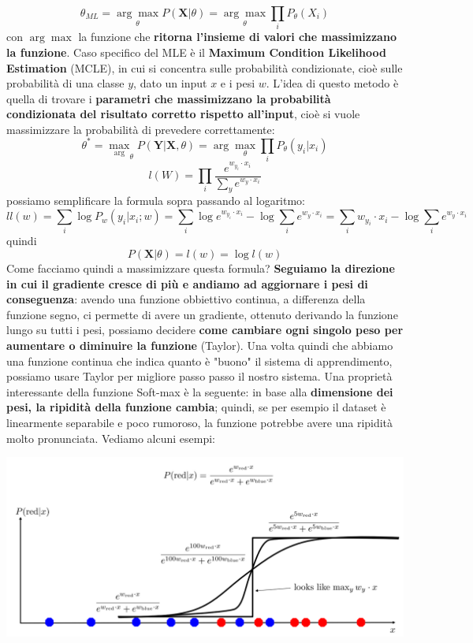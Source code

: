 \documentclass[12pt]{article}
\begin{document}
$$\theta_{ML} = \underset{\theta}{\arg \max} P(\boldsymbol{X}|\theta) = \underset{\theta}{\arg \max} \prod_i P_{\theta}(X_i)$$
con $\arg \max$ la funzione che \textbf{ritorna l'insieme di valori che massimizzano la funzione}. Caso specifico del MLE è il \textbf{Maximum Condition Likelihood Estimation} (MCLE), in cui si concentra sulle probabilità condizionate, cioè sulle probabilità di una classe $y$, dato un input $x$ e i pesi $w$.
L'idea di questo metodo è quella di trovare i \textbf{parametri che massimizzano la probabilità condizionata del risultato corretto rispetto all'input}, cioè si vuole massimizzare la probabilità di prevedere correttamente:
$$\theta^* = \underset \arg \max_{\theta} P(\boldsymbol{Y}| \boldsymbol{X}, \theta) = \arg \max_{\theta} \prod_i P_{\theta}(y_i|x_i)$$
$$l(W) = \prod_i \frac{e^{w_{y_i} \cdot x_i}}{\sum_y e^{w_y \cdot x_i}}$$
possiamo semplificare la formula sopra passando al logaritmo:
$$ll(w) = \sum_i \log P_w(y_i|x_i; w) = \sum_i \log e^{w_{y_i} \cdot  x_i} - \log \sum_i e^{w_y \cdot x_i} = \sum_i w_{y_i} \cdot x_i - \log \sum_i e^{w_y \cdot x_i}$$
quindi
$$P(\boldsymbol{X}|\theta) = l(w) = \log l(w)$$
Come facciamo quindi a massimizzare questa formula? \textbf{Seguiamo la direzione in cui il gradiente cresce di più e andiamo ad aggiornare i pesi di conseguenza}: avendo una funzione obbiettivo continua, a differenza della funzione segno, ci permette
di avere un gradiente, ottenuto derivando la funzione lungo su tutti i pesi, possiamo decidere \textbf{come cambiare ogni singolo peso per aumentare o diminuire la funzione} (Taylor).
Una volta quindi che abbiamo una funzione continua che indica quanto è "buono" il sistema di apprendimento, possiamo usare Taylor per migliore passo passo il nostro sistema.
Una proprietà interessante della funzione Soft-max è la seguente: in base alla \textbf{dimensione dei pesi, la ripidità della funzione cambia}; quindi, se per esempio il dataset è linearmente separabile e poco rumoroso, la funzione potrebbe avere una ripidità molto pronunciata.
Vediamo alcuni esempi:
\begin{center}
    \includegraphics[width =1\linewidth]{Images/114.PNG}
\end{center}
\end{document}
